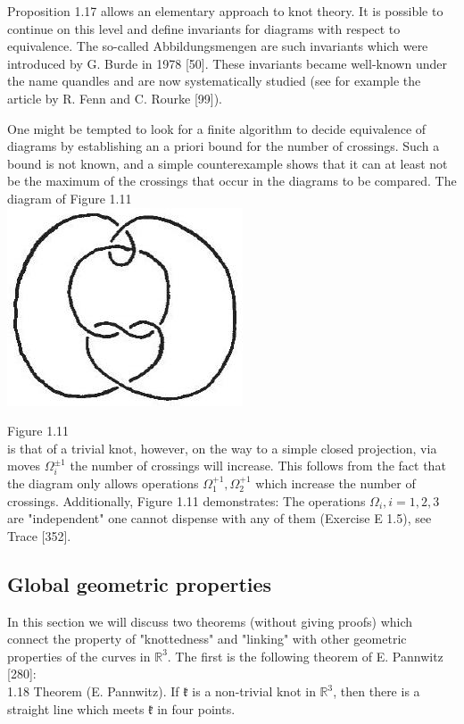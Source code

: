 \documentclass[10pt, letterpaper]{article}
\begin{document}
Proposition 1.17 allows an elementary approach to knot theory. It is possible to continue on this level and define invariants for diagrams with respect to equivalence. The so-called Abbildungsmengen are such invariants which were introduced by G. Burde in 1978 [50]. These invariants became well-known under the name quandles and are now systematically studied (see for example the article by R. Fenn and C. Rourke [99]).

One might be tempted to look for a finite algorithm to decide equivalence of diagrams by establishing an a priori bound for the number of crossings. Such a bound is not known, and a simple counterexample shows that it can at least not be the maximum of the crossings that occur in the diagrams to be compared. The diagram of Figure 1.11\\
\includegraphics[scale=0.2, center]{2025_05_21_9c06be8de7a55410f8c1g-026}

Figure 1.11\\
is that of a trivial knot, however, on the way to a simple closed projection, via moves $\Omega_{i}^{ \pm 1}$ the number of crossings will increase. This follows from the fact that the diagram only allows operations $\Omega_{1}^{+1}, \Omega_{2}^{+1}$ which increase the number of crossings. Additionally, Figure 1.11 demonstrates: The operations $\Omega_{i}, i=1,2,3$ are "independent" one cannot dispense with any of them (Exercise E 1.5), see Trace [352].

\subsection{Global geometric properties}

In this section we will discuss two theorems (without giving proofs) which connect the property of "knottedness" and "linking" with other geometric properties of the curves in $\mathbb{R}^{3}$. The first is the following theorem of E. Pannwitz [280]:\\
1.18 Theorem (E. Pannwitz). If $\mathfrak{k}$ is a non-trivial knot in $\mathbb{R}^{3}$, then there is a straight line which meets $\mathfrak{k}$ in four points.
\end{document}
